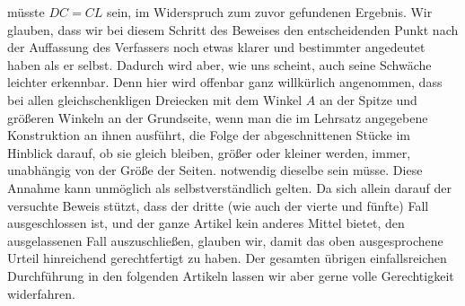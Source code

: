 %
müsste \(DC=CL\) sein, im Widerspruch zum zuvor gefundenen Ergebnis. Wir glauben, dass wir bei diesem Schritt des Beweises den entscheidenden Punkt nach der Auffassung des Verfassers noch etwas klarer und bestimmter angedeutet haben als er selbst. Dadurch wird aber, wie uns scheint, auch seine Schwäche leichter erkennbar. Denn hier wird offenbar ganz willkürlich angenommen, dass bei allen gleichschenkligen Dreiecken mit dem Winkel \(A\) an der Spitze und größeren Winkeln an der Grundseite, wenn man die im Lehrsatz angegebene Konstruktion an ihnen ausführt, die Folge der abgeschnittenen Stücke im Hinblick darauf, ob sie gleich bleiben, größer oder kleiner werden, immer, unabhängig von der Größe der Seiten. notwendig dieselbe sein müsse. Diese Annahme kann unmöglich als selbstverständlich gelten. Da sich allein darauf der versuchte Beweis stützt, dass der dritte (wie auch der vierte und fünfte) Fall ausgeschlossen ist, und der ganze Artikel kein anderes Mittel bietet, den ausgelassenen Fall auszuschließen, glauben wir, damit das oben ausgesprochene Urteil hinreichend gerechtfertigt zu haben. Der gesamten übrigen einfallsreichen Durchführung in den folgenden Artikeln lassen wir aber gerne volle Gerechtigkeit widerfahren.

